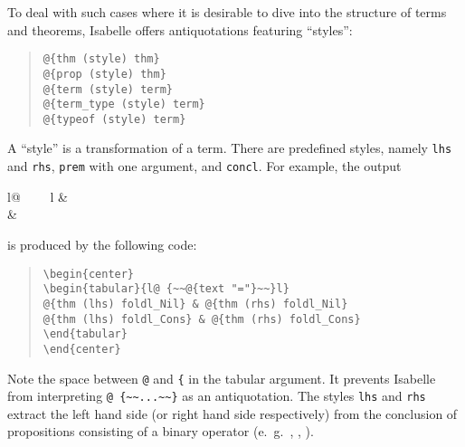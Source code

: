 \begin{isabellebody}
\begin{isamarkuptext}
  To deal with such cases where it is desirable to dive into the structure
  of terms and theorems, Isabelle offers antiquotations featuring
  ``styles'':

    \begin{quote}
    \verb!@!\verb!{thm (style) thm}!\\
    \verb!@!\verb!{prop (style) thm}!\\
    \verb!@!\verb!{term (style) term}!\\
    \verb!@!\verb!{term_type (style) term}!\\
    \verb!@!\verb!{typeof (style) term}!\\
    \end{quote}

  A ``style'' is a transformation of a term. There are predefined
  styles, namely \verb!lhs! and \verb!rhs!, \verb!prem! with one argument, and \verb!concl!.
  For example, 
  the output
  \begin{center}
  \begin{tabular}{l@ {~~\isa{{\isacharequal}}~~}l}
   & \\
   & 
  \end{tabular}
  \end{center}
  is produced by the following code:
  \begin{quote}
    \verb!\begin{center}!\\
    \verb!\begin{tabular}{l@ {~~!\verb!@!\verb!{text "="}~~}l}!\\
    \verb!@!\verb!{thm (lhs) foldl_Nil} & @!\verb!{thm (rhs) foldl_Nil}!\\
    \verb!@!\verb!{thm (lhs) foldl_Cons} & @!\verb!{thm (rhs) foldl_Cons}!\\
    \verb!\end{tabular}!\\
    \verb!\end{center}!
  \end{quote}
  Note the space between \verb!@! and \verb!{! in the tabular argument.
  It prevents Isabelle from interpreting \verb!@ {~~...~~}! 
  as an antiquotation. The styles \verb!lhs! and \verb!rhs!
  extract the left hand side (or right hand side respectively) from the
  conclusion of propositions consisting of a binary operator
  (e.~g.~\isa{{\isacharequal}}, \isa{{\isasymequiv}}, \isa{{\isacharless}}).


\end{isamarkuptext}
\end{isabellebody}
